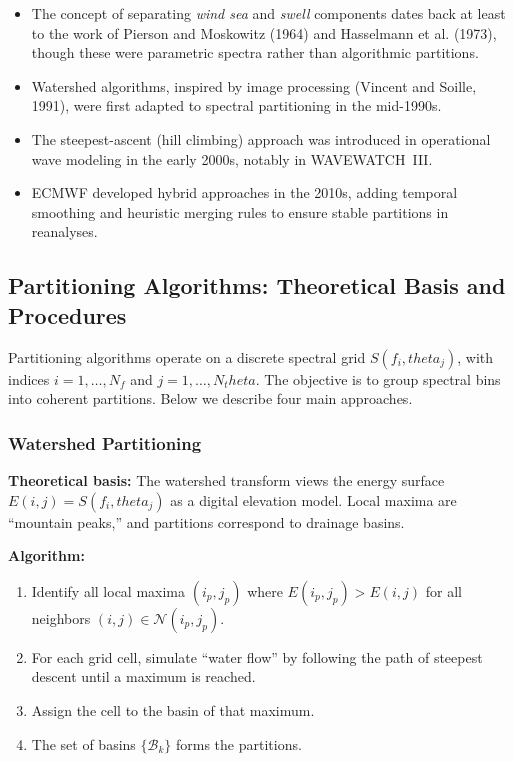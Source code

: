 \documentclass[journal,10pt,twocolumn]{IEEEtran}
\def\theta{theta}%
\begin{document}
    \begin{itemize}[leftmargin=1.4em]
        \item The concept of separating \emph{wind sea} and \emph{swell} components dates back at least to the work of Pierson and Moskowitz (1964) and Hasselmann et al. (1973), though these were parametric spectra rather than algorithmic partitions.
        \item Watershed algorithms, inspired by image processing (Vincent and Soille, 1991), were first adapted to spectral partitioning in the mid-1990s.
        \item The steepest-ascent (hill climbing) approach was introduced in operational wave modeling in the early 2000s, notably in WAVEWATCH~III.
        \item ECMWF developed hybrid approaches in the 2010s, adding temporal smoothing and heuristic merging rules to ensure stable partitions in reanalyses.
    \end{itemize}

    \subsection{Partitioning Algorithms: Theoretical Basis and Procedures}
    Partitioning algorithms operate on a discrete spectral grid $S(f_i,\theta_j)$, with indices $i = 1,\dots,N_f$ and $j=1,\dots,N_\theta$. The objective is to group spectral bins into coherent partitions. Below we describe four main approaches.

    \subsubsection{Watershed Partitioning}
    \textbf{Theoretical basis:} The watershed transform views the energy surface $E(i,j) = S(f_i,\theta_j)$ as a digital elevation model. Local maxima are ``mountain peaks,'' and partitions correspond to drainage basins.

    \textbf{Algorithm:}
    \begin{enumerate}[leftmargin=1.5em]
        \item Identify all local maxima $(i_p,j_p)$ where $E(i_p,j_p) > E(i,j)$ for all neighbors $(i,j) \in \mathcal{N}(i_p,j_p)$.
        \item For each grid cell, simulate ``water flow'' by following the path of steepest descent until a maximum is reached.
        \item Assign the cell to the basin of that maximum.
        \item The set of basins $\{\mathcal{B}_k\}$ forms the partitions.
    \end{enumerate}
\end{document}
